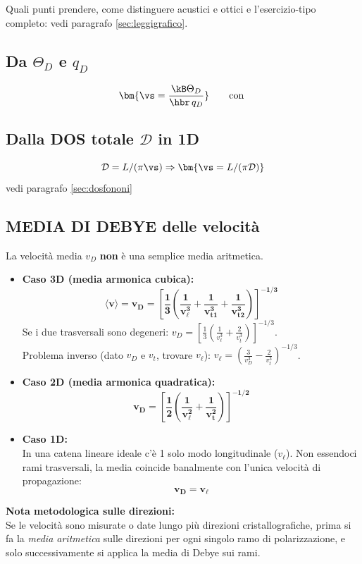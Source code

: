 Quali punti prendere, come distinguere acustici e ottici e l'esercizio-tipo completo: vedi paragrafo \ref{sec:leggigrafico}. 


\subsection{Da $\Theta_D$ e $q_D$}
\[ \bm{\vs = \frac{\kB\Theta_D}{\hbr\,q_D}} \qquad\text{con }  \]

\subsection{Dalla DOS totale $\mathcal{D}$ in 1D}
\[\mathcal{D} = L/(\pi \vs) \Rightarrow \bm{\vs = L/(\pi\mathcal{D})}\] 
vedi paragrafo \ref{sec:dosfononi}

\subsection{MEDIA DI DEBYE delle velocità}
La velocità media $v_D$ \textbf{non} è una semplice media aritmetica.
\begin{itemize}
    \item  \textbf{Caso 3D (media armonica cubica):}
\[ \bm{\langle v\rangle = v_D = \left[\frac{1}{3}\left(\frac{1}{v_\ell^3}+\frac{1}{v_{t1}^3}+\frac{1}{v_{t2}^3}\right)\right]^{-1/3}} \]
Se i due trasversali sono degeneri: $\displaystyle v_D=\left[\frac13\left(\frac{1}{v_\ell^3}+\frac{2}{v_t^3}\right)\right]^{-1/3}$.
\\ Problema inverso (dato $v_D$ e $v_t$, trovare $v_\ell$):
$\displaystyle v_\ell = \left(\frac{3}{v_D^3}-\frac{2}{v_t^3}\right)^{-1/3}$.

\item \textbf{Caso 2D (media armonica quadratica):}
\[ \bm{v_D = \left[\frac{1}{2}\left(\frac{1}{v_\ell^2}+\frac{1}{v_t^2}\right)\right]^{-1/2}} \]

\item \textbf{Caso 1D:}
\\ In una catena lineare ideale c'è 1 solo modo longitudinale ($v_\ell$). Non essendoci rami trasversali, la media coincide banalmente con l'unica velocità di propagazione:
\[ \bm{v_D = v_\ell} \]
\end{itemize}
\vspace{0.3cm}
\noindent \textbf{Nota metodologica sulle direzioni:}
\\ Se le velocità sono misurate o date lungo più direzioni cristallografiche, prima si fa la \emph{media aritmetica} sulle direzioni per ogni singolo ramo di polarizzazione, e solo successivamente si applica la media di Debye sui rami.


